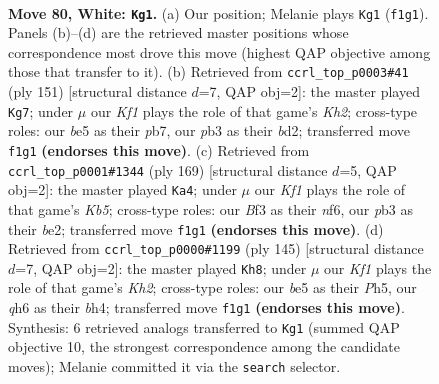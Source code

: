 \documentclass[11pt]{article}
\begin{document}
\clearpage

\begin{figure}[p]\centering
\begin{subfigure}{0.46\textwidth}\centering
\resizebox{\linewidth}{!}{%
\newchessgame
\chessboard[
  setfen={8/8/7q/4b3/8/1p3B2/3k4/5K2 w - - 2 80},
  showmover=false,
  pgfstyle=straightmove, color=movearrow, markmove={f1-g1}
]}
\caption{}
\end{subfigure}\hfill
\begin{subfigure}{0.46\textwidth}\centering
\resizebox{\linewidth}{!}{%
\newchessgame
\chessboard[
  setfen={8/1P5k/4Q3/8/8/8/K2B4/3R4 b - - 0 76},
  showmover=false,
  pgfstyle=straightmove, color=movearrow, markmove={h7-g7}
]}
\caption{}
\end{subfigure}
\\[4pt]
\begin{subfigure}{0.46\textwidth}\centering
\resizebox{\linewidth}{!}{%
\newchessgame
\chessboard[
  setfen={8/2K5/5N2/8/1k6/6Q1/4B3/8 b - - 2 85},
  showmover=false,
  pgfstyle=straightmove, color=movearrow, markmove={b4-a4}
]}
\caption{}
\end{subfigure}\hfill
\begin{subfigure}{0.46\textwidth}\centering
\resizebox{\linewidth}{!}{%
\newchessgame
\chessboard[
  setfen={8/4K2k/8/5P1p/b6B/8/8/8 b - - 2 73},
  showmover=false,
  pgfstyle=straightmove, color=movearrow, markmove={h7-h8}
]}
\caption{}
\end{subfigure}
\caption{\textbf{Move 80, White: \texttt{Kg1}.} (a) Our position; Melanie plays \texttt{Kg1} (\texttt{f1g1}). Panels (b)--(d) are the retrieved master positions whose correspondence most drove this move (highest QAP objective among those that transfer to it). (b) Retrieved from \texttt{ccrl\_top\_p0003\#41} (ply 151) [structural distance $d$=7, QAP obj=2]: the master played \texttt{Kg7}; under $\mu$ our \emph{Kf1} plays the role of that game's \emph{Kh2}; cross-type roles: our \emph{b}e5 as their \emph{p}b7, our \emph{p}b3 as their \emph{b}d2; transferred move \texttt{f1g1} \textbf{(endorses this move)}. (c) Retrieved from \texttt{ccrl\_top\_p0001\#1344} (ply 169) [structural distance $d$=5, QAP obj=2]: the master played \texttt{Ka4}; under $\mu$ our \emph{Kf1} plays the role of that game's \emph{Kb5}; cross-type roles: our \emph{B}f3 as their \emph{n}f6, our \emph{p}b3 as their \emph{b}e2; transferred move \texttt{f1g1} \textbf{(endorses this move)}. (d) Retrieved from \texttt{ccrl\_top\_p0000\#1199} (ply 145) [structural distance $d$=7, QAP obj=2]: the master played \texttt{Kh8}; under $\mu$ our \emph{Kf1} plays the role of that game's \emph{Kh2}; cross-type roles: our \emph{b}e5 as their \emph{P}h5, our \emph{q}h6 as their \emph{b}h4; transferred move \texttt{f1g1} \textbf{(endorses this move)}. Synthesis: 6 retrieved analogs transferred to \texttt{Kg1} (summed QAP objective 10, the strongest correspondence among the candidate moves); Melanie committed it via the \texttt{search} selector.}
\label{fig:thought-m158}
\end{figure}
\end{document}
